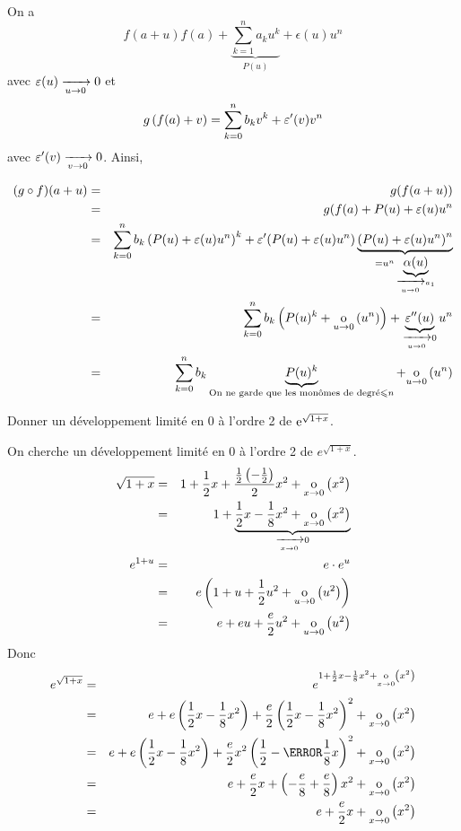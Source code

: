 \documentclass{magnolia}
\begin{document}
\begin{preuve}
On a $$f(a+u)f(a)+\underbrace{\sum_{k=1}^n a_k u^k}_{P(u)}+\epsilon(u)u^n$$ avec $\varepsilon(u)\xrightarrow[u\rightarrow 0]{}{0}$ et 
$$g\left(f(a)+v\right)=\sum_{k=0}^n b_k v^k+\varepsilon'(v)v^n$$ avec $\varepsilon'(v)\xrightarrow[v\rightarrow 0]{}{0}$.
Ainsi,

\begin{eqnarray*}
(g\circ f)(a+u)&=&g(f(a+u))\\
&=&g(f(a)+P(u)+\varepsilon(u)u^n\\
&=&\sum_{k=0}^n b_k \left(P(u)+\varepsilon(u)u^n\right)^k+\varepsilon'(P(u)+\varepsilon(u)u^n)\underbrace{\left(P(u)+\varepsilon(u)u^n\right)^n}_{=u^n\underbrace{\alpha(u)}_{\xrightarrow[u\rightarrow 0]{}{a_1}}}\\
&=&\sum_{k=0}^n b_k\left(P(u)^k+\underset{u \rightarrow 0}{\text{o}}\left(u^n\right)\right)+\underbrace{\varepsilon''(u)}_{\xrightarrow[u\rightarrow 0]{}{0}}u^n\\
&=&\sum_{k=0}^n b_k\underbrace{P(u)^k}_{\text{On ne garde que les monômes de degré}\leqslant n}+\underset{u \rightarrow 0}{\text{o}}\left(u^n\right)
\end{eqnarray*}

\end{preuve}

\begin{exoUnique}
\exo Donner un développement limité en 0 à l'ordre 2 de ${\rm e}^{\sqrt{1+x}}$.
  \begin{sol}
  On cherche un développement limité en 0 à l'ordre 2 de $e^{\sqrt{1+x}}$.
  \begin{eqnarray*}
  \sqrt{1+x} &=& 1+\frac{1}{2}x+\frac{\frac{1}{2}\p{-\frac{1}{2}}}{2}x^2
                 +\petitozero{x}{x^2}\\
             &=& 1+
    \underbrace{\frac{1}{2}x-\frac{1}{8}x^2+\petitozero{x}{x^2}}_{%
     \tendvers{x}{0}0}\\
  e^{1+u} &=& e\cdot e^u\\
         &=& e\p{1+u+\frac{1}{2}u^2+\petitozero{u}{u^2}}\\
         &=& e+eu+\frac{e}{2}u^2+\petitozero{u}{u^2}
  \end{eqnarray*}
  Donc
  \begin{eqnarray*}
  e^{\sqrt{1+x}}
  &=& e^{1+\frac{1}{2}x-\frac{1}{8}x^2+\petitozero{x}{x^2}}\\
  &=& e+e\p{\frac{1}{2}x-\frac{1}{8}x^2}+\frac{e}{2}
      \p{\frac{1}{2}x-\frac{1}{8}x^2}^2+\petitozero{x}{x^2}\\
  &=& e+e\p{\frac{1}{2}x-\frac{1}{8}x^2}+\frac{e}{2}
      x^2 \p{\frac{1}{2}-\cancel{\frac{1}{8}x}}^2+\petitozero{x}{x^2}\\
  &=& e+\frac{e}{2}x+\p{-\frac{e}{8}+\frac{e}{8}}x^2+\petitozero{x}{x^2}\\
  &=& e+\frac{e}{2}x+\petitozero{x}{x^2}
  \end{eqnarray*}    
  \end{sol}
\end{exoUnique}
\end{document}
